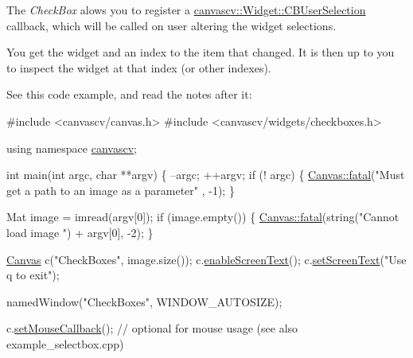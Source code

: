 The {\itshape Check\+Box} alows you to register a \hyperlink{classcanvascv_1_1Widget_a977cbd39cf203c5866f07f3645c7e4bc}{canvascv\+::\+Widget\+::\+C\+B\+User\+Selection} callback, which will be called on user altering the widget selections.

You get the widget and an index to the item that changed. It is then up to you to inspect the widget at that index (or other indexes).

See this code example, and read the notes after it\+: 
\begin{DoxyCode}
\textcolor{preprocessor}{#include <canvascv/canvas.h>}
\textcolor{preprocessor}{#include <canvascv/widgets/checkboxes.h>}

\textcolor{keyword}{using namespace }\hyperlink{namespacecanvascv}{canvascv};

\textcolor{keywordtype}{int} main(\textcolor{keywordtype}{int} argc, \textcolor{keywordtype}{char} **argv)
\{
    --argc;
    ++argv;
    \textcolor{keywordflow}{if} (! argc)
    \{
        \hyperlink{classcanvascv_1_1Canvas_add93c0d5cc1e9b49f97510952a8a1961}{Canvas::fatal}(\textcolor{stringliteral}{"Must get a path to an image as a parameter"} , -1);
    \}

    Mat image = imread(argv[0]);
    \textcolor{keywordflow}{if} (image.empty())
    \{
        \hyperlink{classcanvascv_1_1Canvas_add93c0d5cc1e9b49f97510952a8a1961}{Canvas::fatal}(\textcolor{keywordtype}{string}(\textcolor{stringliteral}{"Cannot load image "}) + argv[0], -2);
    \}

    \hyperlink{classcanvascv_1_1Canvas}{Canvas} c(\textcolor{stringliteral}{"CheckBoxes"}, image.size());
    c.\hyperlink{classcanvascv_1_1Canvas_ae68d3277e738d349232400b38f0e5f9e}{enableScreenText}();
    c.\hyperlink{classcanvascv_1_1Canvas_aaedea276b82a8a4cfc0895ae81113cfd}{setScreenText}(\textcolor{stringliteral}{"Use q to exit"});

    namedWindow(\textcolor{stringliteral}{"CheckBoxes"}, WINDOW\_AUTOSIZE);

    c.\hyperlink{classcanvascv_1_1Canvas_acf6e5d4b40aec610b0dc8c4f6bf93ac1}{setMouseCallback}(); \textcolor{comment}{// optional for mouse usage (see also example\_selectbox.cpp)}


\end{DoxyCode}

